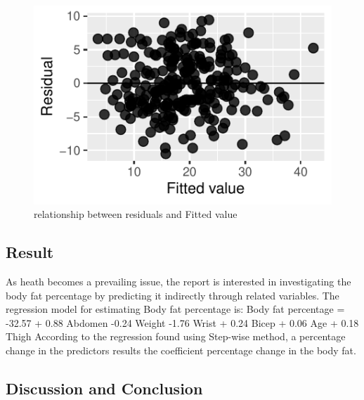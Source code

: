 \documentclass[letterpaper,9pt,twocolumn,twoside,]{pinp}
\begin{document}
\begin{figure}[!h]

{\centering \includegraphics{Report_012E01_files/figure-latex/unnamed-chunk-3-1} 

}

\caption{relationship between residuals and Fitted value}\label{fig:unnamed-chunk-3}
\end{figure}

\hypertarget{result}{%
\subsection{Result}\label{result}}

As heath becomes a prevailing issue, the report is interested in
investigating the body fat percentage by predicting it indirectly
through related variables. The regression model for estimating Body fat
percentage is: Body fat percentage = -32.57 + 0.88 Abdomen -0.24 Weight
-1.76 Wrist + 0.24 Bicep + 0.06 Age + 0.18 Thigh According to the
regression found using Step-wise method, a percentage change in the
predictors results the coefficient percentage change in the body fat.

\hypertarget{discussion-and-conclusion}{%
\subsection{Discussion and Conclusion}\label{discussion-and-conclusion}}
\end{document}
